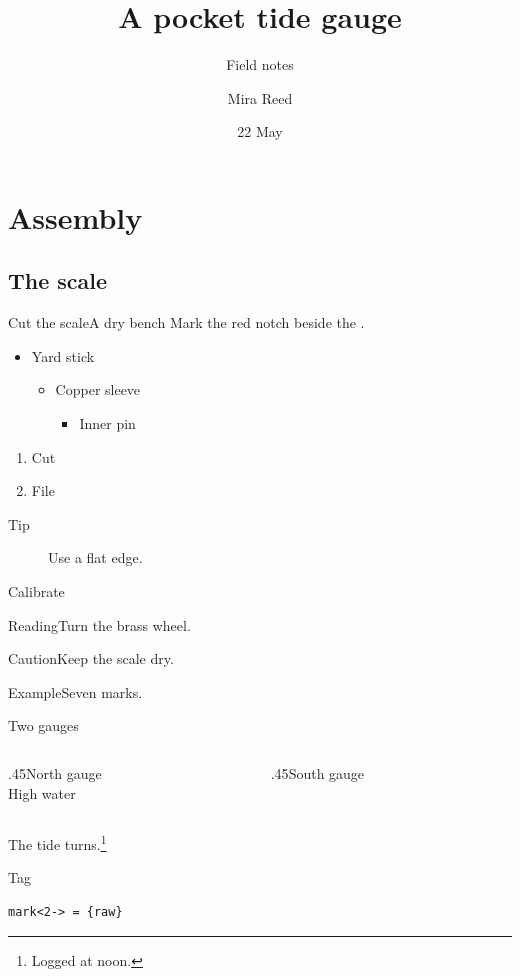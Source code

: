 \documentclass{beamer}
\title{A pocket tide gauge}
\subtitle{Field notes}
\author{Mira Reed}
\institute{Harbour Workshop}
\date{22 May}
\begin{document}
\frame{\titlepage}
\section{Assembly}
\subsection{The scale}
\begin{frame}[t,label=scale]{Cut the scale}{A dry bench}
Mark the \alert{red notch} beside the .
\begin{itemize}
\item Yard stick
\begin{itemize}\item Copper sleeve
\begin{itemize}\item Inner pin\end{itemize}
\end{itemize}
\end{itemize}
\begin{enumerate}\item Cut\item File\end{enumerate}
\begin{description}\item[Tip] Use a flat edge.\end{description}
\end{frame}
\begin{frame}{Calibrate}
\begin{block}{Reading}Turn the brass wheel.\end{block}
\begin{alertblock}{Caution}Keep the scale dry.\end{alertblock}
\begin{exampleblock}{Example}Seven marks.\end{exampleblock}
\end{frame}
\begin{frame}[b]{Two gauges}
\begin{columns}[t]
\begin{column}{.45\textwidth}North gauge\\High water\end{column}
\begin{column}{.45\textwidth}South gauge\end{column}
\end{columns}
The tide turns.\footnote{Logged at noon.}
\end{frame}
\begin{frame}{Tag}
\begin{verbatim}
mark<2-> = {raw}
\end{verbatim}
\end{frame}
\appendix
\end{document}
